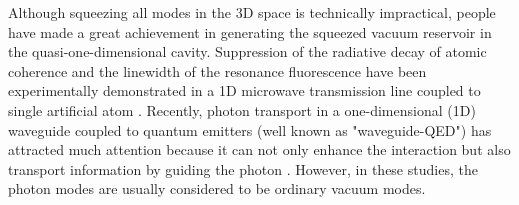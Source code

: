 \documentclass[aps,showpacs,twocolumn,twoside,groupedaddress]{revtex4}
\begin{document}
Although squeezing all modes in the 3D space is technically impractical, people have made a great achievement in generating the squeezed vacuum reservoir in the quasi-one-dimensional cavity.  Suppression of the radiative decay of atomic coherence and the linewidth of the resonance fluorescence have been experimentally demonstrated in a 1D microwave transmission line coupled to single artificial atom  \cite{turchette1998qa, murch2013kw, toyli2016resonance, bergeal2010analog, wang2018cavity, qin2018exponentially}. Recently, photon transport in a one-dimensional (1D) waveguide coupled to quantum emitters (well known as "waveguide-QED") has attracted much attention because it can not only enhance the interaction but also transport information by guiding the photon \cite{shen2005coherent, shen2007strongly, yudson2008multiphoton, liao2015single, liao2016dynamical, liao2016review, roy2017review}. However, in these studies, the photon modes are usually considered to be ordinary vacuum modes.   %



\end{document}
